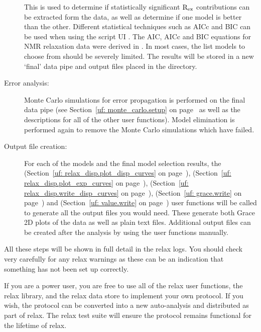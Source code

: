 \begin{description}
    This is used to determine if statistically significant $\mathrm{R}_{\textrm{ex}}$ contributions can be extracted form the data, as well as determine if one model is better than the other.
    Different statistical techniques such as AICc and BIC can be used when using the script UI \citep{HurvichTsai89,Schwarz78}.
    The AIC, AICc and BIC equations for NMR relaxation data were derived in \citet{dAuvergneGooley03}.
    In most cases, the list models to choose from should be severely limited.
    The results will be stored in a new `final' data pipe and output files placed in the  directory.
  \item[Error analysis:]  Monte Carlo simulations for error propagation is performed on the final data pipe (see Section~\ref{uf: monte_carlo.setup} on page~\pageref{uf: monte_carlo.setup} as well as the descriptions for all of the other  user functions).
    Model elimination is performed again to remove the Monte Carlo simulations which have failed.
  \item[Output file creation:]  For each of the models and the final model selection results, the  (Section~\ref{uf: relax_disp.plot_disp_curves} on page~\pageref{uf: relax_disp.plot_disp_curves}),  (Section~\ref{uf: relax_disp.plot_exp_curves} on page~\pageref{uf: relax_disp.plot_exp_curves}),  (Section~\ref{uf: relax_disp.write_disp_curves} on page~\pageref{uf: relax_disp.write_disp_curves}),  (Section~\ref{uf: grace.write} on page~\pageref{uf: grace.write}) and  (Section~\ref{uf: value.write} on page~\pageref{uf: value.write}) user functions will be called to generate all the output files you would need.
    These generate both Grace 2D plots of the data as well as plain text files.
    Additional output files can be created after the analysis by using the user functions manually.
\end{description}

All these steps will be shown in full detail in the relax logs.
You should check very carefully for any relax warnings as these can be an indication that something has not been set up correctly.

If you are a power user, you are free to use all of the relax user functions, the relax library, and the relax data store to implement your own protocol.
If you wish, the protocol can be converted into a new auto-analysis and distributed as part of relax.
The relax test suite will ensure the protocol remains functional for the lifetime of relax.

